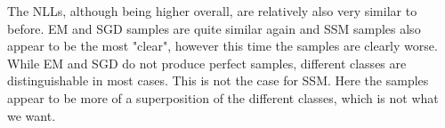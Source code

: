 The NLLs, although being higher overall, are relatively also very similar to before. 
EM and SGD samples are quite similar again and SSM samples also appear to be the most "clear", 
however this time the samples are clearly worse. While EM and SGD do not 
produce perfect samples, different classes are distinguishable in most cases. This is not the case for SSM. 
Here the samples appear to be more of a superposition of the different classes, which is not what we want.